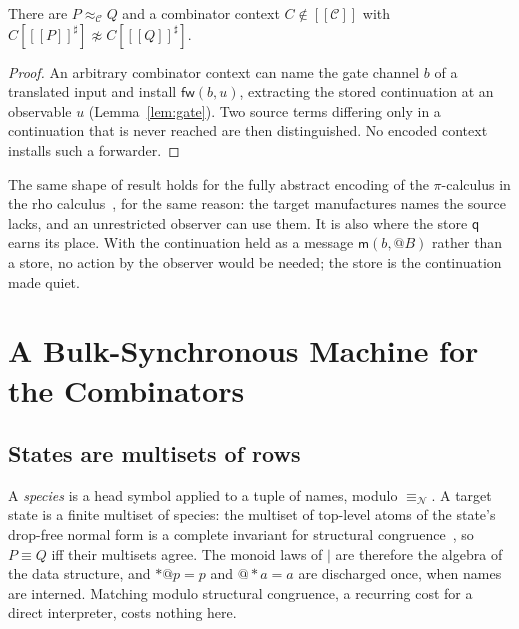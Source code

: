 \documentclass[acmsmall,screen,review,anonymous]{acmart}
\makeatletter
\newcommand{\quo}[1]{@#1}
\newcommand{\drp}[1]{{*}#1}
\newcommand{\enc}[1]{[\![#1]\!]}
\newcommand{\nameq}{\equiv_{\mathcal{N}}}
\newcommand{\Ctx}{\mathscr{C}}
\newcommand{\bisim}{\approx}
\newcommand{\scong}{\equiv}
\newcommand{\mm}{\mathsf{m}}
\newcommand{\fw}{\mathsf{fw}}
\newcommand{\qq}{\mathsf{q}}
\makeatother
\begin{document}
\begin{proposition}
\label{prop:forced}
There are $P \bisim_{\Ctx} Q$ and a combinator context $C \notin \enc{\Ctx}$
with $C[\enc{P}^{\sharp}] \not\bisim C[\enc{Q}^{\sharp}]$.
\end{proposition}

\begin{proof}
An arbitrary combinator context can name the gate channel $b$ of a translated
input and install $\fw(b,u)$, extracting the stored continuation at an
observable $u$ (Lemma~\ref{lem:gate}). Two source terms differing only in a
continuation that is never reached are then distinguished. No encoded context
installs such a forwarder.
\end{proof}

The same shape of result holds for the fully abstract encoding of the
$\pi$-calculus in the rho calculus~\cite{AnonNowns,Lybech22}, for the same
reason: the target manufactures names the source lacks, and an unrestricted
observer can use them. It is also where the store $\qq$ earns its place. With
the continuation held as a message $\mm(b,\quo{B})$ rather than a store, no
action by the observer would be needed; the store is the continuation made
quiet.

\section{A Bulk-Synchronous Machine for the Combinators}
\label{sec:machine}

\subsection{States are multisets of rows}
\label{sec:states}

A \emph{species} is a head symbol applied to a tuple of names, modulo
$\nameq$. A target state is a finite multiset of species: the multiset of
top-level atoms of the state's drop-free normal form is a complete invariant
for structural congruence~\cite{AnonLogic}, so $P \scong Q$ iff their
multisets agree. The monoid laws of $\mid$ are therefore the algebra of the
data structure, and $\drp{\quo{p}} = p$ and $\quo{\drp{a}} = a$ are discharged
once, when names are interned. Matching modulo structural congruence, a
recurring cost for a direct interpreter, costs nothing here.
\end{document}
